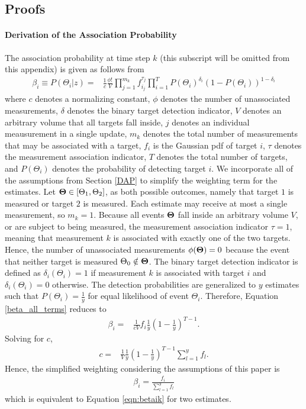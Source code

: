 \documentclass[letterpaper, 10pt, conference]{ieeeconf}
\begin{document}
\begin{appendix}
\label{append}

\subsection{Proofs}

\paragraph{Derivation of the Association Probability}
The association probability at time step $k$ (this subscript will be omitted from this appendix) is given as follows from~\cite[Section 9.3]{TrackDataAssoc}
\begin{align}
\label{beta_all_terms}
\beta_i\equiv P(\Theta_i|z)=&\frac{1}{c}\frac{\phi!}{V}\displaystyle\prod_{j=1}^{m_k} f_{i_j}^{\tau_j}\displaystyle\prod_{i=1}^{T} P(\Theta_i)^{\delta_i}(1-P(\Theta_i))^{1-\delta_i}
\end{align}
where $c$ denotes a normalizing constant, $\phi$ denotes the number of unassociated measurements, $\delta$ denotes the binary target detection indicator, $V$ denotes an arbitrary volume that all targets fall inside, $j$ denotes an individual meausurement in a single update, $m_k$ denotes the total number of measurements that may be associated with a target, $f_{i}$ is the Gaussian pdf of target $i$, $\tau$ denotes the measurement association indicator, $T$ denotes the total number of targets, and $P(\Theta_i)$ denotes the probability of detecting target $i$.
We incorporate all of the assumptions from Section \ref{DAP} to simplify the weighting term for the estimates.
Let ${\bf{\Theta}}\in[\Theta_1, \Theta_2]$, as both possible outcomes, namely that target $1$ is measured or target $2$ is measured.
Each estimate may receive at most a single measurement, so $m_k=1$.
Because all events ${\bf{\Theta}}$ fall inside an arbitrary volume $V$, or are subject to being measured, the measurement association indicator $\tau=1$, meaning that measurement $k$ is associated with exactly one of the two targets.
Hence, the number of unassociated measurements $\phi({\bf{\Theta}})=0$ because the event that neither target is measured $\Theta_0\notin{\bf{\Theta}}$.
The binary target detection indicator is defined as $\delta_i(\Theta_i)=1$ if measurement $k$ is associated with target $i$ and $\delta_i(\Theta_i)=0$ otherwise.
The detection probabilities are generalized to $y$ estimates such that $P(\Theta_i)=\frac{1}{y}$ for equal likelihood of event $\Theta_i$.
Therefore, Equation \ref{beta_all_terms} reduces to
\begin{align}
\beta_i=&\frac{1}{cV}f_{i}\frac{1}{y}(1-\frac1y)^{T-1}.
\end{align}
Solving for $c$,
\begin{align}
c=&\frac{1}{V}\frac{1}{y}(1-\frac1y)^{T-1}\displaystyle\sum\limits_{l=1}^y f_{l}.
\end{align}
Hence, the simplified weighting considering the assumptions of this paper is
\begin{align}
\beta_i=\frac{f_i}{\displaystyle\sum\limits_{l=1}^y f_{l}}
\end{align}
which is equivalent to Equation \ref{eqn:betaik} for two estimates.



\end{appendix}
\end{document}
